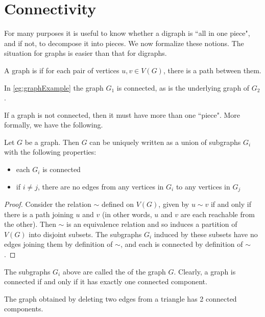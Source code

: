 \section{Connectivity}
\label{sec:connectivity}

For many purposes it is useful to know whether a digraph is ``all in one
piece", and if not, to decompose it into pieces. We now formalize these
notions. The situation for graphs is easier than that for digraphs.

\begin{Definition} 
A graph is  if for each pair of 
vertices $u, v\in V(G)$, there is a path between them.
\end{Definition}

In \cref{eg:graphExample} the graph $G_1$ is connected, as is the
underlying graph of $G_2$. 

If a graph is not connected, then it must have more than one ``piece".
More formally, we have the following.

\begin{Theorem}
\label{thm:components}
Let $G$ be a graph. Then $G$ can be uniquely written as a union of
subgraphs $G_i$ with the following properties:
\begin{itemize}
\item each $G_i$ is connected
\item if $i\neq j$, there are no edges from any vertices in $G_i$ 
to any vertices in $G_j$
\end{itemize}
\end{Theorem}

\begin{proof}
Consider the relation $\sim$ defined on $V(G)$, given by $u\sim v$ if
and only if there is a path joining $u$ and $v$ (in other words, $u$ and
$v$ are each reachable from the other). Then $\sim$ is an equivalence
relation and so induces a partition of $V(G)$ into disjoint subsets. The
subgraphs $G_i$ induced by these subsets have no edges joining them by
definition of $\sim$, and each is connected by definition of $\sim$.
\end{proof}

The subgraphs $G_i$ above are called the 
of the graph $G$. Clearly, a graph is connected if and only if it has
exactly one connected component.

\begin{Example}
\label{eg:components}
The graph obtained by deleting two edges from a triangle has 2 connected 
components.
\end{Example}

